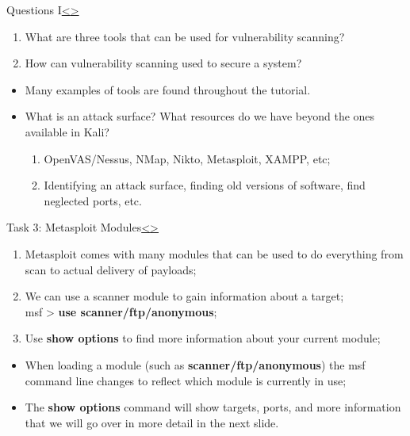 \documentclass[12pt]{extarticle}
\newenvironment{instructionblock}{\Large\bgroup}{\egroup}
\begin{document}
\pagebreak
\begin{slide}{Questions I}{\hyperref[slide 11]{\textless}\hyperref[slide 13]{\textgreater}}
	\begin{instructionblock}
		\begin{enumerate}
			\item What are three tools that can be used for vulnerability scanning?
			\item How can vulnerability scanning used to secure a system?
		\end{enumerate}
	\end{instructionblock}
\end{slide}
\begin{itemize}
	\item Many examples of tools are found throughout the tutorial.
	\item What is an attack surface? What resources do we have beyond the ones available in Kali?
	\begin{enumerate}
		\item OpenVAS/Nessus, NMap, Nikto, Metasploit, XAMPP, etc;
		\item Identifying an attack surface, finding old versions of software, find neglected ports, etc.
	\end{enumerate}
\end{itemize}
\pagebreak

\begin{slide}{Task 3: Metasploit Modules}{\hyperref[slide 12]{\textless}\hyperref[slide 14]{\textgreater}}
\begin{instructionblock}
\begin{enumerate}
		\item Metasploit comes with many modules that can be used to do everything from scan to actual delivery of payloads;
		\item We can use a scanner module to gain information about a target\cite{b4};\\
		
		msf > \textbf{use scanner/ftp/anonymous};
		
		\item Use \textbf{show options} to find more information about your current module;
\end{enumerate}
\end{instructionblock}
\end{slide}
\begin{itemize}
	\item When loading a module (such as \textbf{scanner/ftp/anonymous}) the msf command line changes to reflect which module is currently in use\cite{b4};
	\item The \textbf{show options} command will show targets, ports, and more information that we will go over in more detail in the next slide.
\end{itemize}
\pagebreak
\end{document}

